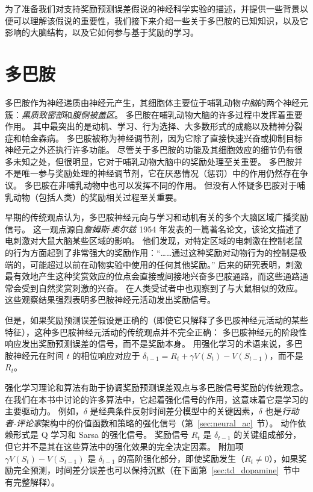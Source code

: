 为了准备我们对支持奖励预测误差假说的神经科学实验的描述，并提供一些背景以便可以理解该假说的重要性，我们接下来介绍一些关于多巴胺的已知知识，以及它影响的大脑结构，以及它如何参与基于奖励的学习。


\section{多巴胺} \label{sec:dopamine}

多巴胺作为神经递质由神经元产生，其细胞体主要位于哺乳动物\textit{中脑}的两个神经元簇：\textit{黑质致密部}和\textit{腹侧被盖区}。
多巴胺在哺乳动物大脑的许多过程中发挥着重要作用。
其中最突出的是动机、学习、行为选择、大多数形式的成瘾以及精神分裂症和帕金森病。
多巴胺被称为神经调节剂，因为它除了直接快速兴奋或抑制目标神经元之外还执行许多功能。
尽管关于多巴胺的功能及其细胞效应的细节仍有很多未知之处，但很明显，它对于哺乳动物大脑中的奖励处理至关重要。
多巴胺并不是唯一参与奖励处理的神经调节剂，它在厌恶情况（惩罚）中的作用仍然存在争议。
多巴胺在非哺乳动物中也可以发挥不同的作用。
但没有人怀疑多巴胺对于哺乳动物（包括人类）的奖励相关过程至关重要。


早期的传统观点认为，多巴胺神经元向与学习和动机有关的多个大脑区域广播奖励信号。
这一观点源自\textit{詹姆斯$\cdot$奥尔兹} 1954 年发表的一篇著名论文，该论文描述了电刺激对大鼠大脑某些区域的影响。
他们发现，对特定区域的电刺激在控制老鼠的行为方面起到了非常强大的奖励作用：“……通过这种奖励对动物行为的控制是极端的，可能超过以前在动物实验中使用的任何其他奖励\cite{olds1954positive}。”
后来的研究表明，刺激最有效地产生这种奖赏效应的位点会直接或间接地兴奋多巴胺通路，而这些通路通常会受到自然奖赏刺激的兴奋。
在人类受试者中也观察到了与大鼠相似的效应。
这些观察结果强烈表明多巴胺神经元活动发出奖励信号。


但是，如果奖励预测误差假设是正确的（即使它只解释了多巴胺神经元活动的某些特征），这种多巴胺神经元活动的传统观点并不完全正确：
多巴胺神经元的阶段性响应发出奖励预测误差的信号，而不是奖励本身。
用强化学习的术语来说，多巴胺神经元在时间 $ t $ 的相位响应对应于 $ \delta_{t-1} = R_t + \gamma V(S_t) - V(S_{t-1}) $，而不是 $ R_t $。


强化学习理论和算法有助于协调奖励预测误差观点与多巴胺信号奖励的传统观念。
在我们在本书中讨论的许多算法中，它起着强化信号的作用，这意味着它是学习的主要驱动力。
例如，$ \delta $ 是经典条件反射时间差分模型中的关键因素，$ \delta $ 也是\textit{行动者-评论家}架构中的价值函数和策略的强化信号（第~\ref{sec:neural_ac}~节）。
动作依赖形式是 Q 学习和 Sarsa 的强化信号。
奖励信号 $ R_t $ 是 $ \delta_{t-1} $ 的关键组成部分，但它并不是其在这些算法中的强化效果的完全决定因素。
附加项 $ \gamma V(S_t) - V(S_{t-1}) $ 是 $ \delta_{t-1} $ 的高阶强化部分，即使奖励发生（$ R_t \neq 0 $），如果奖励完全预测，时间差分误差也可以保持沉默（在下面第~\ref{sec:td_dopamine}~节中有完整解释）。


